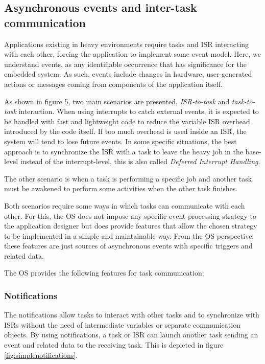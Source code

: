 \subsection{Asynchronous events and inter-task communication}
Applications existing in heavy environments require tasks and ISR interacting with each other, forcing the application to implement some event model.
Here, we understand events, as any identifiable occurrence that has significance for the embedded system. As such, events include changes in hardware, user-generated actions or messages coming from components of the application itself.



As shown in figure 5, two main scenarios are presented, \textit{ISR-to-task} and \textit{task-to-task} interaction.  When using interrupts to catch external events, it is expected to be handled with fast and lightweight code to reduce the variable ISR overhead introduced by the code itself. If too much overhead is used inside an ISR, the system will tend to lose future events. In some specific situations, the best approach is to synchronize the ISR with a task to leave the heavy job in the base-level instead of the interrupt-level, this is also called  \textit{Deferred Interrupt Handling}.

The other scenario is when a task is performing a specific job and another task must be awakened to perform some activities when the other task finishes.
\medskip

Both scenarios require some ways in which tasks can communicate with each other.
For this, the OS does not impose any specific event processing strategy to the application designer but does provide features that allow the chosen strategy to be implemented in a simple and maintainable way. From the OS perspective, these features are just sources of asynchronous events with specific triggers and related data. 
\medskip

The OS provides the following features for task communication:

\subsubsection{Notifications} \label{osnotifications}
The notifications allow tasks to interact with other tasks and to synchronize with ISRs without the need of intermediate variables or separate communication objects. By using notifications, a task or ISR can launch another task sending an event and related data to the receiving task.  This is depicted in figure \ref{fig:simplenotifications}.


